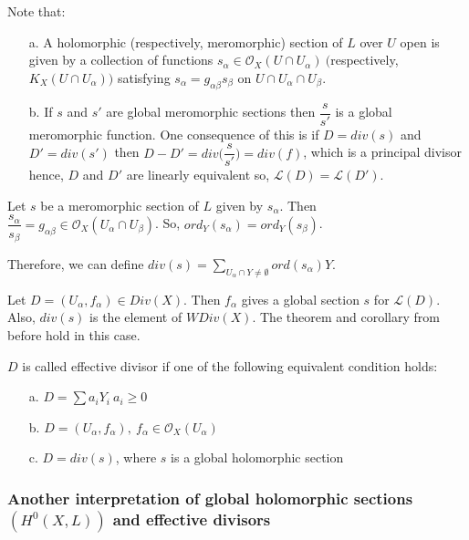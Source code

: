 Note that:
\begin{itemize}
\item[a.] A holomorphic (respectively, meromorphic) section of $L$ over $U$ open is given by a collection of functions $s_{\alpha} \in \mathcal{O}_{X}(U \cap U_{\alpha})~($respectively, $K_{X}(U \cap U_{\alpha}))$ satisfying $s_{\alpha}=g_{\alpha\beta}s_{\beta}$ on $U \cap U_{\alpha} \cap U_{\beta}$.
\item[b.] If $s$ and $s'$ are global meromorphic sections then $\dfrac{s}{s'}$ is a global meromorphic function. One consequence of this is if $D=div(s)$ and $D'=div(s')$ then $D-D'=div\bigg(\dfrac{s}{s'}\bigg)=div(f)$, which is a principal divisor hence, $D$ and $D'$ are linearly equivalent so, $\mathcal{L}(D)=\mathcal{L}(D')$.

\end{itemize}

Let $s$ be a meromorphic section of $L$ given by ${s_{\alpha}}$. Then $\dfrac{s_{\alpha}}{s_{\beta}}=g_{\alpha\beta} \in \mathcal{O}_{X}(U_{\alpha} \cap U_{\beta})$. So, $ord_{Y}(s_{\alpha})= ord_{Y}(s_{\beta})$. 

Therefore, we can define $div(s)= \sum_{U_{\alpha} \cap Y \neq \emptyset} ord(s_{\alpha})Y$.

\begin{example}
Let $D=({U_{\alpha}}, {f_{\alpha}}) \in Div(X)$. Then ${f_{\alpha}}$ gives a global section $s$ for $\mathcal{L}(D)$. Also, $div(s)$ is the element of $WDiv(X)$. The theorem and corollary from before hold in this case.

\end{example}

\begin{remark}

$D$ is called effective divisor if one of the following equivalent condition holds:

\begin{itemize}
\item[a.] $D=\sum a_{i}Y_{i}~a_{i}\geq0$
\item[b.] $D=({U_{\alpha}}, {f_{\alpha}}),~f_{\alpha}\in \mathcal{O}_{X}(U_{\alpha})$
\item[c.] $D=div(s)$, where $s$ is a global holomorphic section
\end{itemize}
\end{remark}

\subsubsection{Another interpretation of global holomorphic sections $(H^0(X,L))$ and effective divisors}

